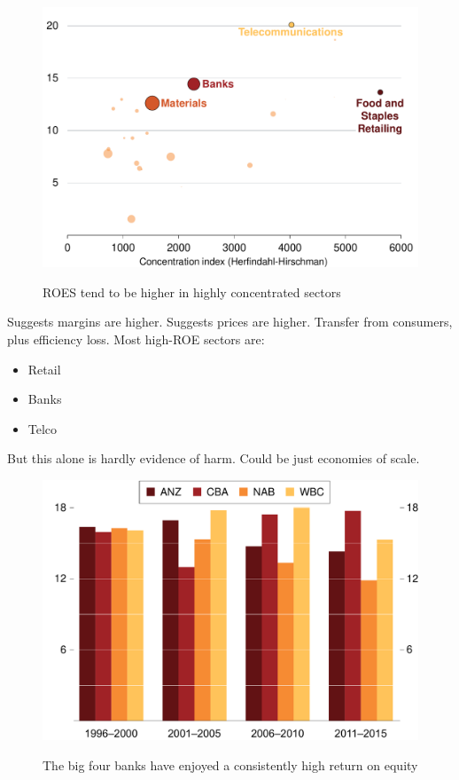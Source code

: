 \begin{figure}[p] 
 \caption{ROES tend to be higher in highly concentrated sectors}
 \includegraphics[page=1]{atlas/HH_RoE}\label{fig:ROEMargin}
\end{figure}

Suggests margins are higher. Suggests prices are higher. Transfer from consumers, plus efficiency loss. Most high-ROE sectors are:
\begin{itemize}
    \item Retail
    \item Banks
    \item Telco
\end{itemize} 

But this alone is hardly evidence of harm. Could be just economies of scale. 

\begin{figure}[p] 
 \caption{The big four banks have enjoyed a consistently high return on equity}
 \includegraphics[page=1]{atlas/Banks_ROE}\label{fig:ROE_banks}

\end{figure}


